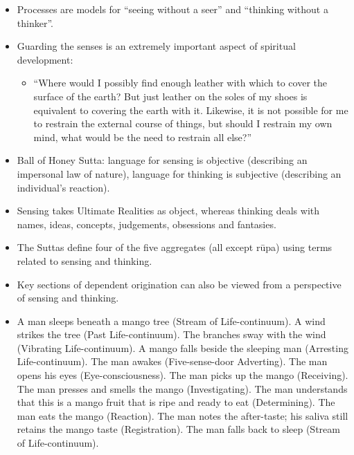 \begin{itemize}

\item Processes are models for “seeing without a seer” and “thinking without a thinker”.

\item Guarding the senses is an extremely important aspect of spiritual development:

\begin{itemize}

\item “Where would I possibly find enough leather with which to cover the surface of the earth? But just leather on the soles of my shoes is equivalent to covering the earth with it. Likewise, it is not possible for me to restrain the external course of things, but should I restrain my own mind, what would be the need to restrain all else?”

\end{itemize}

\item Ball of Honey Sutta: language for sensing is objective (describing an impersonal law of nature), language for thinking is subjective (describing an individual’s reaction).

\item Sensing takes Ultimate Realities as object, whereas thinking deals with names, ideas, concepts, judgements, obsessions and fantasies.

\item The Suttas define four of the five aggregates (all except rūpa) using terms related to sensing and thinking.

\item Key sections of dependent origination can also be viewed from a perspective of sensing and thinking.

\item A man sleeps beneath a mango tree (Stream of Life-continuum). A wind strikes the tree (Past Life-continuum). The branches sway with the wind (Vibrating Life-continuum). A mango falls beside the sleeping man (Arresting Life-continuum). The man awakes (Five-sense-door Adverting). The man opens his eyes (Eye-consciousness). The man picks up the mango (Receiving). The man presses and smells the mango (Investigating). The man understands that this is a mango fruit that is ripe and ready to eat (Determining). The man eats the mango (Reaction). The man notes the after-taste; his saliva still retains the mango taste (Registration). The man falls back to sleep (Stream of Life-continuum).


\end{itemize}
